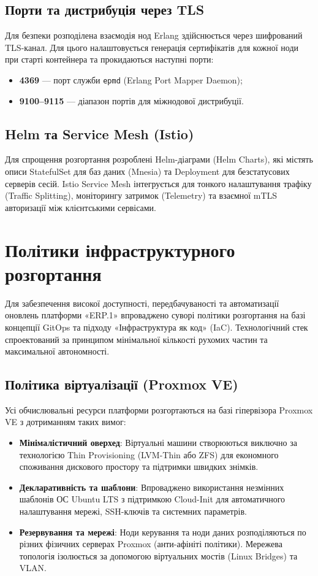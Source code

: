 \subsection{Порти та дистрибуція через TLS}
Для безпеки розподілена взаємодія нод Erlang здійснюється через шифрований TLS-канал. Для цього налаштовується генерація сертифікатів для кожної ноди при старті контейнера та прокидаються наступні порти:
\begin{itemize}
    \item \textbf{4369} --- порт служби \texttt{epmd} (Erlang Port Mapper Daemon);
    \item \textbf{9100--9115} --- діапазон портів для міжнодової дистрибуції.
\end{itemize}

\subsection{Helm та Service Mesh (Istio)}
 
Для спрощення розгортання розроблені Helm-діаграми (Helm Charts), які містять описи StatefulSet для баз даних (Mnesia) та Deployment для безстатусових серверів сесій. Istio Service Mesh інтегрується для тонкого налаштування трафіку (Traffic Splitting), моніторингу затримок (Telemetry) та взаємної mTLS авторизації між клієнтськими сервісами.

\section{Політики інфраструктурного розгортання}
    
Для забезпечення високої доступності, передбачуваності та автоматизації оновлень платформи «ERP.1» впроваджено суворі політики розгортання на базі концепції GitOps та підходу «Інфраструктура як код» (IaC). Технологічний стек спроектований за принципом мінімальної кількості рухомих частин та максимальної автономності.

\subsection{Політика віртуалізації (Proxmox VE)}
Усі обчислювальні ресурси платформи розгортаються на базі гіпервізора Proxmox VE з дотриманням таких вимог:
\begin{itemize}
    \item \textbf{Мінімалістичний оверхед}: Віртуальні машини створюються виключно за технологією Thin Provisioning (LVM-Thin або ZFS) для економного споживання дискового простору та підтримки швидких знімків.
    \item \textbf{Декларативність та шаблони}: Впроваджено використання незмінних шаблонів ОС Ubuntu LTS з підтримкою Cloud-Init для автоматичного налаштування мережі, SSH-ключів та системних параметрів.
    \item \textbf{Резервування та мережі}: Ноди керування та ноди даних розподіляються по різних фізичних серверах Proxmox (анти-афініті політики). Мережева топологія ізолюється за допомогою віртуальних мостів (Linux Bridges) та VLAN.
\end{itemize}

